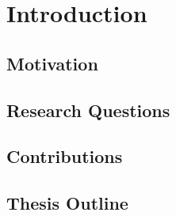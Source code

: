 
\chapter{Introduction}
\label{chap:introduction}


\section{Motivation}
\label{sec:motivation}


\section{Research Questions}
\label{sec:research_questions}


\section{Contributions}
\label{sec:contributions}


\section{Thesis Outline}
\label{sec:outline}


\endinput

